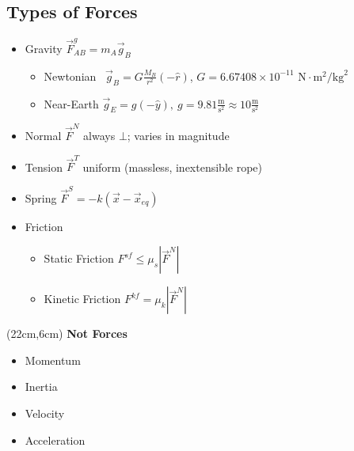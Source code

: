 \documentclass[]{article}
\begin{document}
\newpage
\begin{TeacherMargin}

\end{TeacherMargin}
\begin{PresentSpace}
\vspace{-10pt}
\section*{Types of Forces}
\vspace{-10pt}
\begin{itemize}
	\item Gravity \qquad \qquad \qquad \qquad $\vec{F}^{g}_{AB} = m_{A}\vec{g}_{B}$
	\begin{itemize}
		\item Newtonian \qquad\ $\vec{g}_{B} = G\frac{M_{B}}{r^{2}}(-\hat{r})$, $G = 6.67408\times10^{-11}\text{ N}\cdot\text{m}^{2}/\text{kg}^{2}$
		\item Near-Earth \qquad $\vec{g}_{E} = g(-\hat{y}),\ g=9.81\frac{\text{m}}{\text{s}^{2}} \approx 10\frac{\text{m}}{\text{s}^{2}}$
	\end{itemize}
	\item Normal \qquad $\vec{F}^{N}$ always $\bot$; varies in magnitude
	\item Tension \qquad $\vec{F}^{T}$ uniform (massless, inextensible rope)
	\item Spring \qquad $\vec{F}^{S}=-k(\vec{x}-\vec{x}_{eq})$
	\item Friction
	\begin{itemize}
		\item Static Friction \qquad $F^{sf}\leq\mu_{s}|\vec{F}^{N}|$
		\item Kinetic Friction \qquad $F^{kf}=\mu_{k}|\vec{F}^{N}|$
	\end{itemize}
\end{itemize}
\end{PresentSpace}
\begin{textblock*}{5cm}(22cm,6cm)
\Large
\noindent\textbf{Not Forces}
\begin{itemize}
	\normalsize
	\item Momentum
	\item Inertia
	\item Velocity
	\item Acceleration
\end{itemize}
\end{textblock*}
\newpage
\begin{TeacherMargin}

\end{TeacherMargin}
\end{document}
